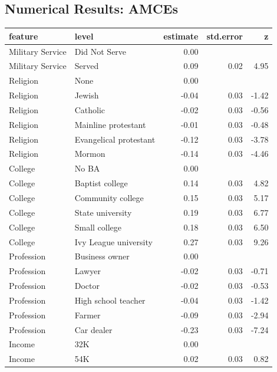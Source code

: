 \documentclass[a4paper,12pt]{article}\usepackage[]{graphicx}\usepackage[]{color}
\begin{document}
\clearpage

\subsection{Numerical Results: AMCEs}

\begin{table}[ht]
\centering
\begingroup\footnotesize
\begin{tabular}{lp{3in}rrr}
  \hline
feature & level & estimate & std.error & z \\ 
  \hline
Military Service & Did Not Serve & 0.00 &  &  \\ 
  Military Service & Served & 0.09 & 0.02 & 4.95 \\ 
  Religion & None & 0.00 &  &  \\ 
  Religion & Jewish & -0.04 & 0.03 & -1.42 \\ 
  Religion & Catholic & -0.02 & 0.03 & -0.56 \\ 
  Religion & Mainline protestant & -0.01 & 0.03 & -0.48 \\ 
  Religion & Evangelical protestant & -0.12 & 0.03 & -3.78 \\ 
  Religion & Mormon & -0.14 & 0.03 & -4.46 \\ 
  College & No BA & 0.00 &  &  \\ 
  College & Baptist college & 0.14 & 0.03 & 4.82 \\ 
  College & Community college & 0.15 & 0.03 & 5.17 \\ 
  College & State university & 0.19 & 0.03 & 6.77 \\ 
  College & Small college & 0.18 & 0.03 & 6.50 \\ 
  College & Ivy League university & 0.27 & 0.03 & 9.26 \\ 
  Profession & Business owner & 0.00 &  &  \\ 
  Profession & Lawyer & -0.02 & 0.03 & -0.71 \\ 
  Profession & Doctor & -0.02 & 0.03 & -0.53 \\ 
  Profession & High school teacher & -0.04 & 0.03 & -1.42 \\ 
  Profession & Farmer & -0.09 & 0.03 & -2.94 \\ 
  Profession & Car dealer & -0.23 & 0.03 & -7.24 \\ 
  Income & 32K & 0.00 &  &  \\ 
  Income & 54K & 0.02 & 0.03 & 0.82 \\ 

\end{tabular}
\end{table}
\end{document}
